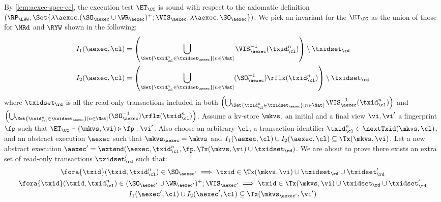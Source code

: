 By \cref{lem:aexec-spec-cc}, the execution test $\ET_\CC$ is sound with respect to the axiomatic definition 
\( (\RP_{\LWW}, \Set{\lambda \aexec. ( \SO_{\aexec} \cup \WR_{\aexec} )^{+} ; \VIS_{\aexec}, \lambda \aexec \ldotp \SO_\aexec })\).
We pick an invariant for the \( \ET_\CC \) as the union of those for \( \MRd\) and \( \RYW \) shown in the following:
\begin{align*}
    I_1(\aexec, \cl) & =  \left( \bigcup_{\Set{\txid_{\cl}^{n} \in \txidset_{\aexec} }[ n \in \Nat ]} \VIS_{\aexec}^{-1}(\txid^n_\cl) \right) \setminus \txidset_\rd \\
    I_2(\aexec, \cl) & =  \left( \bigcup_{\Set{\txid_{\cl}^{n} \in \txidset_{\aexec} }[ n \in \Nat ]} (\SO_{\aexec}^{-1})\rflx(\txid^n_\cl) \right) \setminus \txidset_\rd
\end{align*}
where \( \txidset_\rd \) is all the read-only transactions included in both 
\( \left( \bigcup_{\Set{\txid_{\cl}^{n} \in \txidset_{\aexec} }[ n \in \Nat ]} \VIS_{\aexec}^{-1}(\txid^n_\cl) \right)\) 
and \( \left( \bigcup_{\Set{\txid_{\cl}^{n} \in \txidset_{\aexec} }[ n \in \Nat ]} (\SO_{\aexec}^{-1})\rflx(\txid^n_\cl) \right) \).
Assume a kv-store $\mkvs$, an initial and a final view $\vi, \vi'$  a fingerprint $\fp$ 
such that $\ET_{\CC} \vdash (\mkvs, \vi) \triangleright \fp: \vi'$. 
Also choose an arbitrary $\cl$, a transaction identifier $\txid_\cl^n \in \nextTxid(\mkvs, \cl)$, 
and an abstract execution $\aexec$ such that $\mkvs_{\aexec} = \mkvs$ and 
\( I_1(\aexec, \cl) \cup I_2(\aexec, \cl) \subseteq \Tx(\mkvs, \vi) \).
Let a new abstract execution \( \aexec' = \extend(\aexec, \txid_\cl^n, \fp, \Tx(\mkvs, \vi) \cup \txidset_\rd) \).
We are about to prove there exists an extra set of read-only transactions \( \txidset'_\rd \) such that:
\begin{gather}
    \fora{\txid} (\txid, \txid_\cl^n) \in \SO_{\aexec'} \implies \txid \in \Tx(\mkvs, \vi) \cup \txidset_\rd \cup \txidset'_\rd \label{equ:cc-sound-update-so}\\
    \fora{\txid} (\txid, \txid_\cl^n) \in ( \SO_{\aexec'} \cup \WR_{\aexec'} )^{+} ; \VIS_{\aexec'} \implies \txid \in \Tx(\mkvs, \vi) \cup \txidset_\rd \cup \txidset'_\rd \label{equ:cc-sound-update-visvis}\\
    I_1(\aexec',\cl) \cup I_2(\aexec',\cl) \subseteq \Tx(\mkvs_{\aexec'}, \vi') \label{equ:cc-sound-inv} 
\end{gather}

